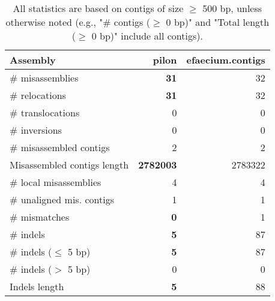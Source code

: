 \documentclass[12pt,a4paper]{article}
\begin{document}
\begin{table}[ht]
\begin{center}
\caption{All statistics are based on contigs of size $\geq$ 500 bp, unless otherwise noted (e.g., "\# contigs ($\geq$ 0 bp)" and "Total length ($\geq$ 0 bp)" include all contigs).}
\begin{tabular}{|l*{2}{|r}|}
\hline
Assembly & pilon & efaecium.contigs \\ \hline
\# misassemblies & {\bf 31} & 32 \\ \hline
\hspace{5mm}\# relocations & {\bf 31} & 32 \\ \hline
\hspace{5mm}\# translocations & 0 & 0 \\ \hline
\hspace{5mm}\# inversions & 0 & 0 \\ \hline
\# misassembled contigs & 2 & 2 \\ \hline
Misassembled contigs length & {\bf 2782003} & 2783322 \\ \hline
\# local misassemblies & 4 & 4 \\ \hline
\# unaligned mis. contigs & 1 & 1 \\ \hline
\# mismatches & {\bf 0} & 1 \\ \hline
\# indels & {\bf 5} & 87 \\ \hline
\hspace{5mm}\# indels ($\leq$ 5 bp) & {\bf 5} & 87 \\ \hline
\hspace{5mm}\# indels ($>$ 5 bp) & 0 & 0 \\ \hline
Indels length & {\bf 5} & 88 \\ \hline
\end{tabular}
\end{center}
\end{table}
\end{document}
